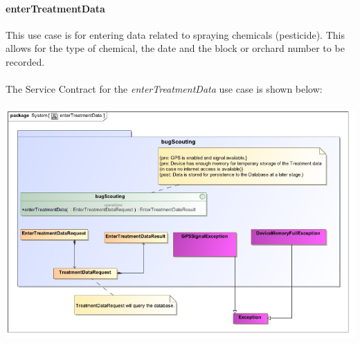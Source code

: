 \documentclass[11pt,a4paper,titlepage]{article}
\begin{document}
		\paragraph{enterTreatmentData }
		This use case is for entering data related to spraying chemicals (pesticide). This allows for the type of chemical, the date and the block or orchard number to be recorded.\\\hfill\\
		
		The Service Contract for the \textit{enterTreatmentData} use case is shown below:\\\hfill\\
		\includegraphics[width=\linewidth]{EnterTreatmentData}
		
\end{document}
